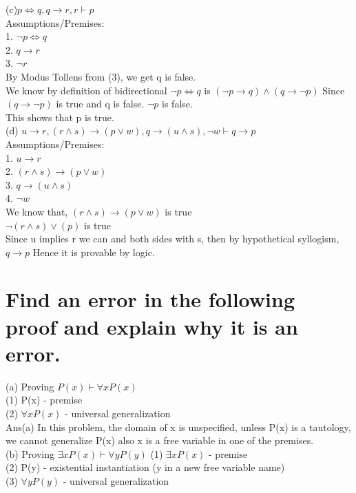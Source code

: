 \documentclass{article}
\begin{document}
\Large (c)$p \iff q, q \rightarrow r, r \vdash p$\\
Assumptions/Premises:\\
1. $\neg p \iff q$\\
2. $q \rightarrow r$\\
3. $\neg r$\\

By Modus Tollens from (3), we get q is false.\\
We know by definition of bidirectional $\neg p \iff q$ is $(\neg p \rightarrow q) \land (q \rightarrow \neg p )$
Since $(q \rightarrow \neg p )$ is true and q is false. $\neg p$ is false.\\
This shows that p is true.\\

\Large (d) $u \rightarrow r, (r \land s) \rightarrow (p \lor w), q \rightarrow (u \land s), \neg w \vdash q \rightarrow p$\\
Assumptions/Premises:\\
1. $u \rightarrow r$\\
2. $(r \land s) \rightarrow (p \lor w)$\\
3. $q \rightarrow (u \land s)$\\
4. $\neg w$\\
We know that,
$(r \land s) \rightarrow (p \lor w)$ is true\\
$\neg (r \land s) \lor (p)$ is true\\
Since u implies r we can and both sides with s, then by hypothetical syllogism,\\
$q \rightarrow p$
Hence it is provable by logic.
\\

\section{Find an error in the following proof and explain why it is an error.}

\Large (a) Proving $P(x) \vdash \forall xP(x)$\\
(1) P(x) - premise\\
(2) $\forall xP(x)$ - universal generalization\\

Ans(a) In this problem, the domain of x is unspecified, unless P(x) is a tautology, we cannot generalize P(x) also x is a free variable in one of the premises.
\\

\Large (b) Proving $\exists xP(x) \vdash \forall yP(y)$
(1) $\exists xP(x)$ - premise\\
(2) P(y) - existential instantiation (y in a new free variable name)\\
(3) $\forall yP(y)$ - universal generalization\\
\end{document}
